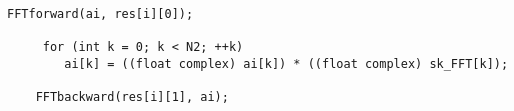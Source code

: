 \lstset{framesep=-10pt, xleftmargin=-10pt}
\begin{lstlisting}[caption={FHEW:Complex Multiplication Sample},label={listing:3.1}]
     FFTforward(ai, res[i][0]);

     for (int k = 0; k < N2; ++k) 
        ai[k] = ((float complex) ai[k]) * ((float complex) sk_FFT[k]);
        
    FFTbackward(res[i][1], ai);
    
\end{lstlisting}

